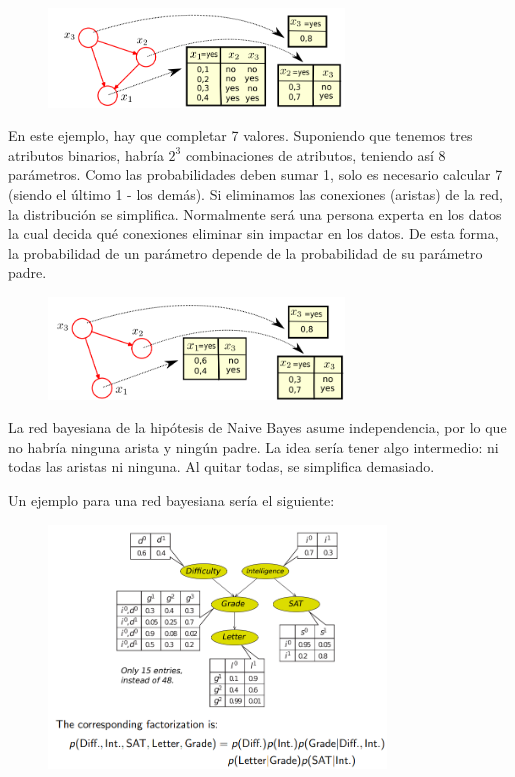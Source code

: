 \begin{figure}[h]
\centering
\includegraphics[width = 0.7\textwidth]{figs/bayesian-network.png}
\end{figure}

En este ejemplo, hay que completar 7 valores. Suponiendo que tenemos tres atributos binarios, habría $2^3$ combinaciones de atributos, teniendo así 8 parámetros. Como las probabilidades deben sumar 1, solo es necesario calcular 7 (siendo el último 1 - los demás). Si eliminamos las conexiones (aristas) de la red, la distribución se simplifica. Normalmente será una persona experta en los datos la cual decida qué conexiones eliminar sin impactar en los datos. De esta forma, la probabilidad de un parámetro depende de la probabilidad de su parámetro padre. 

\begin{figure}[h]
\centering
\includegraphics[width = 0.7\textwidth]{figs/bayesian-network-reduced.png}
\end{figure}

La red bayesiana de la hipótesis de Naive Bayes asume independencia, por lo que no habría ninguna arista y ningún padre. La idea sería tener algo intermedio: ni todas las aristas ni ninguna. Al quitar todas, se simplifica demasiado.

Un ejemplo para una red bayesiana sería el siguiente:
\begin{figure}[h]
\centering
\includegraphics[width = 0.8\textwidth]{figs/bayesian-network-example.png}
\end{figure}

